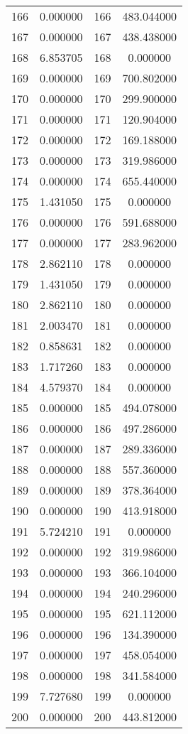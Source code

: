 \documentclass[12pt]{article}
\begin{document}
\begin{longtable}{@{}cccc@{}}
166 & 0.000000 & 166 & 483.044000 \\
167 & 0.000000 & 167 & 438.438000 \\
168 & 6.853705 & 168 & 0.000000 \\
169 & 0.000000 & 169 & 700.802000 \\
170 & 0.000000 & 170 & 299.900000 \\
171 & 0.000000 & 171 & 120.904000 \\
172 & 0.000000 & 172 & 169.188000 \\
173 & 0.000000 & 173 & 319.986000 \\
174 & 0.000000 & 174 & 655.440000 \\
175 & 1.431050 & 175 & 0.000000 \\
176 & 0.000000 & 176 & 591.688000 \\
177 & 0.000000 & 177 & 283.962000 \\
178 & 2.862110 & 178 & 0.000000 \\
179 & 1.431050 & 179 & 0.000000 \\
180 & 2.862110 & 180 & 0.000000 \\
181 & 2.003470 & 181 & 0.000000 \\
182 & 0.858631 & 182 & 0.000000 \\
183 & 1.717260 & 183 & 0.000000 \\
184 & 4.579370 & 184 & 0.000000 \\
185 & 0.000000 & 185 & 494.078000 \\
186 & 0.000000 & 186 & 497.286000 \\
187 & 0.000000 & 187 & 289.336000 \\
188 & 0.000000 & 188 & 557.360000 \\
189 & 0.000000 & 189 & 378.364000 \\
190 & 0.000000 & 190 & 413.918000 \\
191 & 5.724210 & 191 & 0.000000 \\
192 & 0.000000 & 192 & 319.986000 \\
193 & 0.000000 & 193 & 366.104000 \\
194 & 0.000000 & 194 & 240.296000 \\
195 & 0.000000 & 195 & 621.112000 \\
196 & 0.000000 & 196 & 134.390000 \\
197 & 0.000000 & 197 & 458.054000 \\
198 & 0.000000 & 198 & 341.584000 \\
199 & 7.727680 & 199 & 0.000000 \\
200 & 0.000000 & 200 & 443.812000 \\

\end{longtable}
\end{document}
